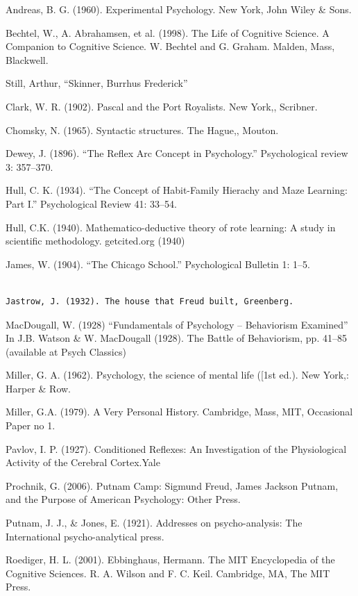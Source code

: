 Andreas, B. G. (1960). Experimental Psychology. New York, John Wiley \& Sons.

Bechtel, W., A. Abrahamsen, et al. (1998). The Life of Cognitive Science. A Companion to Cognitive Science. W. Bechtel and G. Graham. Malden, Mass, Blackwell.

Still, Arthur, “Skinner, Burrhus Frederick”

Clark, W. R. (1902). Pascal and the Port Royalists. New York,, Scribner.

Chomsky, N. (1965). Syntactic structures. The Hague,, Mouton.

Dewey, J. (1896). ``The Reflex Arc Concept in Psychology.'' Psychological review 3: 357--370.

Hull, C. K. (1934). ``The Concept of Habit-Family Hierachy and Maze Learning: Part I.'' Psychological Review 41: 33--54.

Hull, C.K. (1940). Mathematico-deductive theory of rote learning: A study in scientific methodology. getcited.org (1940)

James, W. (1904). ``The Chicago School.'' Psychological Bulletin 1: 1--5.

\begin{adjustwidth}{2.5em}{2.5em}
\begin{verbatim}

Jastrow, J. (1932). The house that Freud built, Greenberg.

\end{verbatim}
\end{adjustwidth}

MacDougall, W. (1928) “Fundamentals of Psychology – Behaviorism Examined” In J.B. Watson \& W. MacDougall (1928). The Battle of Behaviorism, pp. 41--85 (available at Psych Classics)

Miller, G. A. (1962). Psychology, the science of mental life ([1st ed.). New York,: Harper \& Row.

Miller, G.A. (1979). A Very Personal History. Cambridge, Mass, MIT, Occasional Paper no 1.

Pavlov, I. P. (1927). Conditioned Reflexes: An Investigation of the Physiological Activity of the Cerebral Cortex.Yale

Prochnik, G. (2006). Putnam Camp: Sigmund Freud, James Jackson Putnam, and the Purpose of American Psychology: Other Press.

Putnam, J. J., \& Jones, E. (1921). Addresses on psycho-analysis: The International psycho-analytical press.

Roediger, H. L. (2001). Ebbinghaus, Hermann. The MIT Encyclopedia of the Cognitive Sciences. R. A. Wilson and F. C. Keil. Cambridge, MA, The MIT Press.


